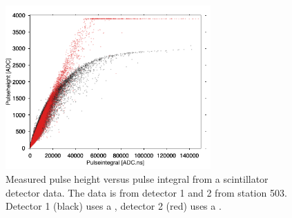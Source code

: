 \begin{figure}
    \centering
    \includegraphics[width=0.7\textwidth]{plots/station/ph_pi_503.png}
    \caption{Measured pulse height versus pulse integral from a scintillator detector data. The data is from detector 1 and 2 from station 503. Detector 1 (black) uses a \senstech \pmt, detector 2 (red) uses a \nikhef \pmt.}
    \label{fig:ph_pi_503}
\end{figure}

